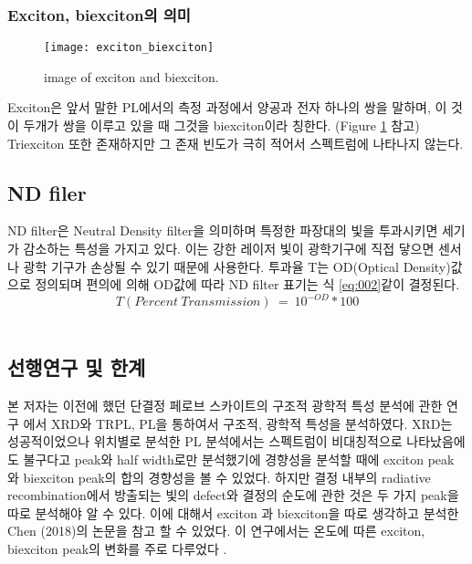 \subsubsection{Exciton, biexciton의 의미}
\begin{figure}[H]
	\begin{center}
			\texttt{[image: exciton\_biexciton]}
	\end{center}
	\caption{image of exciton and biexciton.}
	\label{fig:ex}  
\end{figure}
Exciton은 앞서 말한 PL에서의 측정 과정에서 양공과 전자 하나의 쌍을 말하며, 이 것이 두개가 쌍을 이루고 있을 때 그것을 biexciton이라 칭한다. (Figure \ref{fig:ex} 참고) Triexciton 또한 존재하지만 그 존재 빈도가 극히 적어서 스펙트럼에 나타나지 않는다. 
\\

\subsection{ND filer}
ND filter은 Neutral Density filter을 의미하며 특정한 파장대의 빛을 투과시키면 세기가 감소하는 특성을 가지고 있다. 이는 강한 레이저 빛이 광학기구에 직접 닿으면 센서나 광학 기구가 손상될 수 있기 때문에 사용한다. 투과율 T는 OD(Optical Density)값으로 정의되며 편의에 의해 OD값에 따라 ND filter 표기는 식 \ref{eq:002}\와 같이 결정된다.
\begin{equation}
T(Percent~Transmission)~=~10^{-OD}*100
\label{eq:002}
\end{equation}
\\

\subsection{선행연구 및 한계}
본 저자는 이전에 했던 단결정 페로브 스카이트의 구조적 광학적 특성 분석에 관한 연구 에서 XRD와 TRPL, PL을 통하여서 구조적, 광학적 특성을 분석하였다. XRD는 성공적이었으나 위치별로 분석한 PL 분석에서는 스펙트럼이 비대칭적으로 나타났음에도 불구다고 peak와 half width로만 분석했기에 경향성을 분석할 때에 exciton peak 와 biexciton peak의 합의 경향성을 볼 수 있었다. 하지만 결정 내부의 radiative recombination에서 방출되는 빛의 defect와 결정의 순도에 관한 것은 두 가지 peak을 따로 분석해야 알 수 있다. 이에 대해서 exciton 과 biexciton을 따로 생각하고 분석한 Chen (2018)의 논문을 참고 할 수 있었다. 이 연구에서는 온도에 따른 exciton, biexciton peak의 변화를 주로 다루었다 \cite{chen2018room}. 
\\

